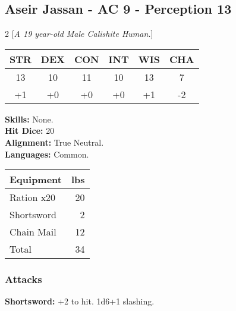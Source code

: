 \subsection*{Aseir Jassan - AC 9 - Perception 13}
\begin{multicols}{2}
[\textit{A 19 year-old Male Calishite Human.}]
\begin{tabular}{cccccc}
 {STR}&
 {DEX}&
 {CON}&
 {INT}&
 {WIS}&
 {CHA}\\
\hline
13 & 10 & 11 & 10 & 13 & 7\\
+1 & +0 & +0 & +0 & +1 & -2
\end{tabular}
\textbf{Skills:} 
None.\\
\textbf{Hit Dice:} 20\\
\textbf{Alignment:} True Neutral.\\
\textbf{Languages:} 
Common.\\

\begin{tabular}{p{} r}
\textbf{Equipment} & lbs\\
\hline

Ration x20 & 20\\

Shortsword & 2\\

Chain Mail & 12\\

\hline
Total & 34
\end{tabular}


\end{multicols}
\subsubsection*{Attacks}
\textbf{Shortsword:} +2 to hit. 1d6+1 slashing.\\
